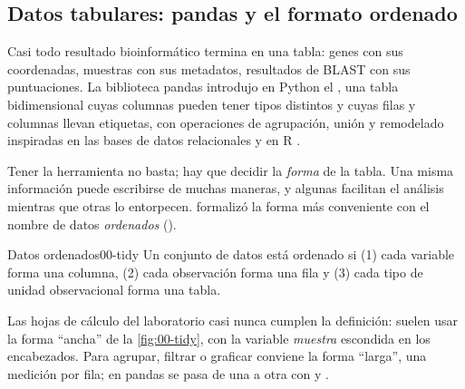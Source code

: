 \subsection{Datos tabulares: pandas y el formato ordenado}

Casi todo resultado bioinformático termina en una tabla: genes con sus coordenadas, muestras con sus metadatos, resultados de BLAST con sus puntuaciones. La biblioteca pandas introdujo en Python el , una tabla bidimensional cuyas columnas pueden tener tipos distintos y cuyas filas y columnas llevan etiquetas, con operaciones de agrupación, unión y remodelado inspiradas en las bases de datos relacionales y en R \parencite{c00-mckinney2010}.

Tener la herramienta no basta; hay que decidir la \emph{forma} de la tabla. Una misma información puede escribirse de muchas maneras, y algunas facilitan el análisis mientras que otras lo entorpecen. \textcite{c00-wickham2014} formalizó la forma más conveniente con el nombre de datos \emph{ordenados} ().

\begin{definicion}{Datos ordenados}{00-tidy}
Un conjunto de datos está ordenado si (1) cada variable forma una columna, (2) cada observación forma una fila y (3) cada tipo de unidad observacional forma una tabla.
\end{definicion}

Las hojas de cálculo del laboratorio casi nunca cumplen la definición: suelen usar la forma ``ancha'' de la \cref{fig:00-tidy}, con la variable \emph{muestra} escondida en los encabezados. Para agrupar, filtrar o graficar conviene la forma ``larga'', una medición por fila; en pandas se pasa de una a otra con  y .


